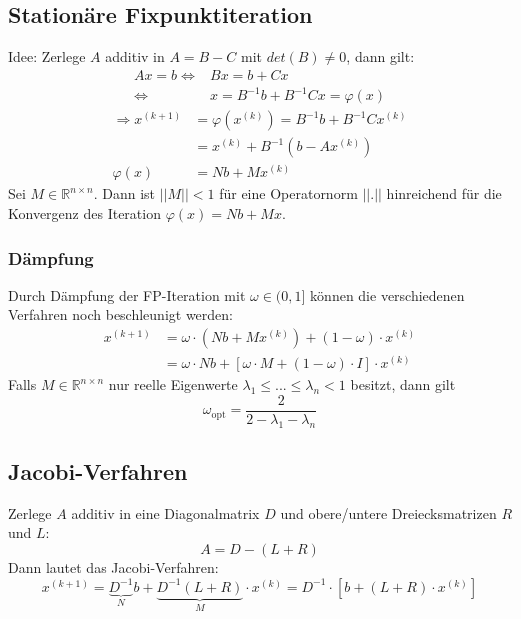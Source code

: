 \documentclass[a4paper,twocolumn,10pt]{article}
\begin{document}
\subsection{Stationäre Fixpunktiteration}
Idee: Zerlege $A$ additiv in $A=B-C$ mit $det(B)\neq 0$, dann gilt:
\begin{equation*}
\begin{split}
Ax=b\Leftrightarrow &Bx=b+Cx\\
\Leftrightarrow &x=B^{-1}b+B^{-1}Cx=\varphi(x)
\end{split}
\end{equation*}
\begin{equation*}
\begin{split}
\Rightarrow x^{(k+1)}&=\varphi\left(x^{(k)}\right)=B^{-1}b+B^{-1}Cx^{(k)}\\
&=x^{(k)}+B^{-1}\left(b-Ax^{(k)}\right)\\
\varphi(x)&=Nb+Mx^{(k)}
\end{split}
\end{equation*}
Sei $M\in\mathbb{R}^{n\times n}$. Dann ist $||M||<1$ für eine Operatornorm $||.||$ hinreichend für die Konvergenz des Iteration $\varphi(x)=Nb+Mx$.

\subsubsection{Dämpfung}
Durch Dämpfung der FP-Iteration mit $\omega\in(0,1]$ können die verschiedenen Verfahren noch beschleunigt werden:
\begin{equation*}
\begin{split}
x^{(k+1)}&=\omega\cdot\left(Nb+Mx^{(k)}\right)+(1-\omega)\cdot x^{(k)}\\
&=\omega\cdot Nb+[\omega\cdot M+(1-\omega)\cdot I]\cdot x^{(k)}
\end{split}
\end{equation*}
Falls $M\in\mathbb{R}^{n\times n}$ nur reelle Eigenwerte $\lambda_1\leq ...\leq\lambda_n<1$ besitzt, dann gilt
\begin{equation*}
\omega_{\text{opt}}=\frac{2}{2-\lambda_1-\lambda_n}
\end{equation*}

\subsection{Jacobi-Verfahren}
Zerlege $A$ additiv in eine Diagonalmatrix $D$ und obere/untere Dreiecksmatrizen $R$ und $L$:
\begin{equation*}
A=D-(L+R)
\end{equation*}
Dann lautet das Jacobi-Verfahren:
\begin{equation*}
x^{(k+1)}=\underbrace{D^{-1}}_{N}b+\underbrace{D^{-1}(L+R)}_{M}\cdot x^{(k)}=D^{-1}\cdot \left[b+(L+R)\cdot x^{(k)}\right]
\end{equation*}
\end{document}
